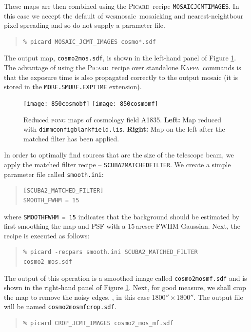 \documentclass[twoside,11pt]{article}
\newcommand{\xref}[3]{#1}
\renewcommand{\_}{\texttt{\symbol{95}}}
\newenvironment{myquote}{\begin{quote}\begin{small}}{\end{small}\end{quote}}
\newcommand{\Kappa}{\xref{\textsc{Kappa}}{sun95}{}}
\newcommand{\picard}{\xref{\textsc{Picard}}{sun231}{}}
\newcommand{\drrecipe}[1]{\texttt{#1}}
\newcommand{\task}[1]{\textsf{#1}}
\newcommand{\wcsmosaic}{\xref{\task{wcsmosaic}}{sun95}{WCSMOSAIC}}
\begin{document}
These maps are then combined using the \picard\ recipe  \texttt{MOSAIC\_JCMT\_IMAGES}. In this case we accept the default of \wcsmosaic\ mosaicking and nearest-neightbour pixel spreading and so do not supply a parameter file. 
\begin{myquote}
\begin{verbatim}
% picard MOSAIC_JCMT_IMAGES cosmo*.sdf
\end{verbatim}
\end{myquote}
The output map, \texttt{cosmo2\_mos.sdf}, is shown in the left-hand panel of Figure \ref{fig:cosmomap}. The advantage of using the \picard\ recipe over standalone \Kappa\ commands is that the exposure time is also propagated correctly to the output mosaic (it is stored in the \texttt{MORE.SMURF.EXP\_TIME} extension).

\begin{figure}
\begin{center}
\texttt{[image: 850cosmo\_bf]}
\hspace{0.3cm}
\texttt{[image: 850cosmo\_mf]} \\
\caption{\small Reduced \textsc{pong} maps of cosmology field A1835. \textbf{Left:} Map reduced with \texttt{dimmconfig\_blank\_field.lis}. \textbf{Right:} Map on the left after the matched filter has been applied.}
\label{fig:cosmomap}
\end{center}
\end{figure}
 
In order to optimally find sources that are the size of the telescope beam, we apply the matched filter recipe -- \drrecipe{SCUBA2\_MATCHED\_FILTER}. We create a simple parameter file called \texttt{smooth.ini}:
\begin{myquote}
\begin{verbatim}
[SCUBA2_MATCHED_FILTER]
SMOOTH_FWHM = 15
\end{verbatim}
\end{myquote}
where \texttt{SMOOTH\_FWHM = 15} indicates that the background should be estimated by first smoothing the map and PSF with a 15\,arcsec FWHM Gaussian. Next, the recipe is executed as follows:
%
\begin{myquote}
\begin{verbatim}
% picard -recpars smooth.ini SCUBA2_MATCHED_FILTER cosmo2_mos.sdf
\end{verbatim}
\end{myquote}
%
The output of this operation is a smoothed image called \texttt{cosmo2\_mos\_mf.sdf} and is shown in the right-hand panel of Figure \ref{fig:cosmomap}.  %
Next, for good measure, we shall crop the map to remove the noisy edges. , in this case 1800$'' \times1800''$. The output file will be named \texttt{cosmo2\_mos\_mf\_crop.sdf}.
\begin{myquote}
\begin{verbatim}
% picard CROP_JCMT_IMAGES cosmo2_mos_mf.sdf
\end{verbatim}
\end{myquote}
\end{document}
